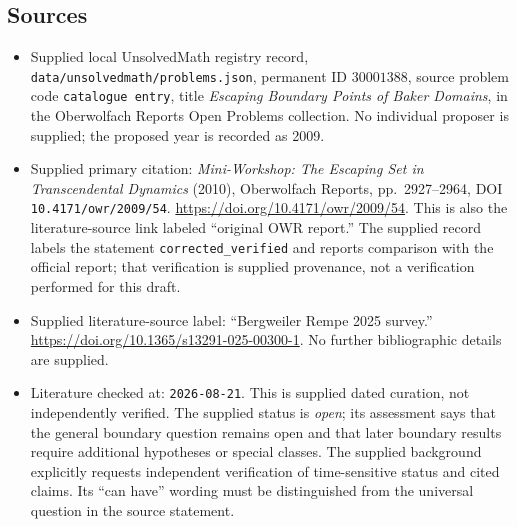 \documentclass[11pt]{article}
\begin{document}
\subsection{Sources}
\begin{itemize}
\item Supplied local UnsolvedMath registry record, \texttt{data/unsolvedmath/problems.json}, permanent ID \(30001388\), source problem code \texttt{catalogue entry}, title \emph{Escaping Boundary Points of Baker Domains}, in the Oberwolfach Reports Open Problems collection. No individual proposer is supplied; the proposed year is recorded as 2009.
\item Supplied primary citation: \emph{Mini-Workshop: The Escaping Set in Transcendental Dynamics} (2010), Oberwolfach Reports, pp.\ 2927--2964, DOI \texttt{10.4171/owr/2009/54}. \url{https://doi.org/10.4171/owr/2009/54}. This is also the literature-source link labeled ``original OWR report.'' The supplied record labels the statement \texttt{corrected\_verified} and reports comparison with the official report; that verification is supplied provenance, not a verification performed for this draft.
\item Supplied literature-source label: ``Bergweiler Rempe 2025 survey.'' \url{https://doi.org/10.1365/s13291-025-00300-1}. No further bibliographic details are supplied.
\item Literature checked at: \texttt{2026-08-21}. This is supplied dated curation, not independently verified. The supplied status is \emph{open}; its assessment says that the general boundary question remains open and that later boundary results require additional hypotheses or special classes. The supplied background explicitly requests independent verification of time-sensitive status and cited claims. Its ``can have'' wording must be distinguished from the universal question in the source statement.
\end{itemize}
\end{document}
